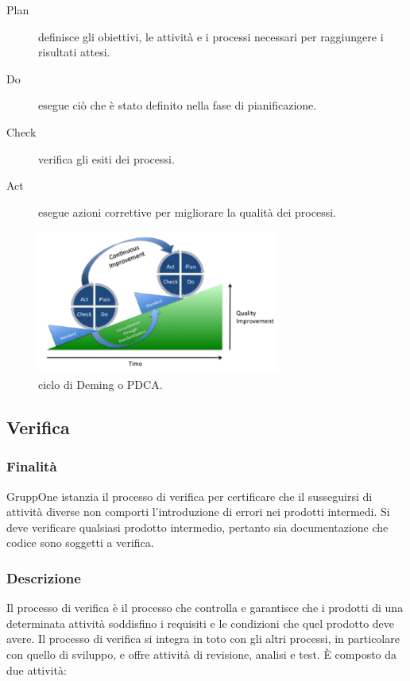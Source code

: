 \documentclass[../norme-di-progetto.tex]{subfiles}
\begin{document}
\begin{description}
  \item [Plan] definisce gli obiettivi, le attività e i processi necessari per raggiungere i risultati attesi.
  \item [Do] esegue ciò che è stato definito nella fase di pianificazione.
  \item [Check] verifica gli esiti dei processi.
  \item [Act] esegue azioni correttive per migliorare la qualità dei processi.
\end{description}
\begin{figure}[H]
  \includegraphics[width=8cm]{PDCA-process.png}
  \centering
  \caption{ciclo di Deming o PDCA.}
\end{figure}

\subsection{Verifica}%
\label{sub:verifica}

\subsubsection{Finalità}%
\label{subs:verifica/finalita}

GruppOne istanzia il processo di verifica per certificare che il susseguirsi di attività diverse non comporti l'introduzione di errori nei prodotti intermedi.
Si deve verificare qualsiasi prodotto intermedio, pertanto sia documentazione che codice sono soggetti a verifica.

\subsubsection{Descrizione}%
\label{subs:verifica/descrizione}

Il processo di verifica è il processo che controlla e garantisce che i prodotti di una determinata attività soddisfino i requisiti e le condizioni che quel prodotto deve avere. Il processo di verifica si integra in toto con gli altri processi, in particolare con quello di sviluppo, e offre attività di revisione, analisi e test. È composto da due attività:
\end{document}
